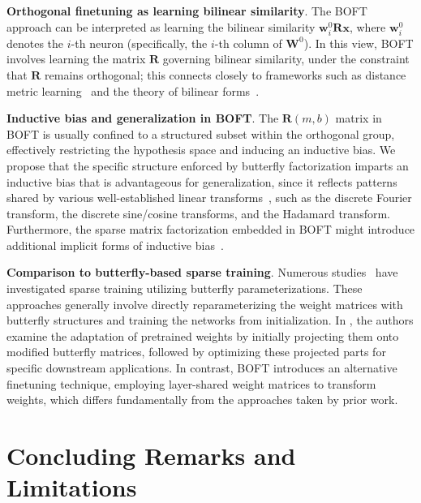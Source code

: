 \textbf{Orthogonal finetuning as learning bilinear similarity}. The BOFT approach can be interpreted as learning the bilinear similarity $\bm{w}^0_i\bm{R}\bm{x}$, where $\bm{w}^0_i$ denotes the $i$-th neuron (specifically, the $i$-th column of $\bm{W}^0$). In this view, BOFT involves learning the matrix $\bm{R}$ governing bilinear similarity, under the constraint that $\bm{R}$ remains orthogonal; this connects closely to frameworks such as distance metric learning~\cite{xing2002distance} and the theory of bilinear forms~\cite{roman2005advanced}.

\textbf{Inductive bias and generalization in BOFT}. The $\bm{R}(m,b)$ matrix in BOFT is usually confined to a structured subset within the orthogonal group, effectively restricting the hypothesis space and inducing an inductive bias. We propose that the specific structure enforced by butterfly factorization imparts an inductive bias that is advantageous for generalization, since it reflects patterns shared by various well-established linear transforms~\cite{dao2019kaleidoscope}, such as the discrete Fourier transform, the discrete sine/cosine transforms, and the Hadamard transform. Furthermore, the sparse matrix factorization embedded in BOFT might introduce additional implicit forms of inductive bias~\cite{gunasekar2017implicit,li2018algorithmic,liu2019neural}.

\textbf{Comparison to butterfly-based sparse training}. Numerous studies~\cite{dao2019learning,dao2019kaleidoscope,chen2022pixelated,dao2022monarch} have investigated sparse training utilizing butterfly parameterizations. These approaches generally involve directly reparameterizing the weight matrices with butterfly structures and training the networks from initialization. In \cite{dao2022monarch}, the authors examine the adaptation of pretrained weights by initially projecting them onto modified butterfly matrices, followed by optimizing these projected parts for specific downstream applications. In contrast, BOFT introduces an alternative finetuning technique, employing layer-shared weight matrices to transform weights, which differs fundamentally from the approaches taken by prior work.



\section{Concluding Remarks and Limitations}

